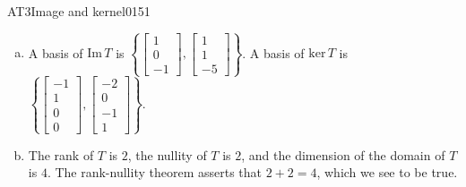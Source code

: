 \begin{exercise}{AT3}{Image and kernel}{0151}
\begin{exerciseAnswer}
\begin{enumerate}[(a)]
 
\item  

 A basis of \(\mathrm{Im}\,T\) is \(\left\{ \left[\begin{array}{c}
1 \\
0 \\
-1
\end{array}\right] , \left[\begin{array}{c}
1 \\
1 \\
-5
\end{array}\right] \right\}\). A basis of \(\mathrm{ker}\,T\) is \(\left\{ \left[\begin{array}{c}
-1 \\
1 \\
0 \\
0
\end{array}\right] , \left[\begin{array}{c}
-2 \\
0 \\
-1 \\
1
\end{array}\right] \right\}\). 

 
\item  

 The rank of \(T\) is \(2\), the nullity of \(T\) is \(2\), and the dimension of the domain of \(T\) is \(4\). The rank-nullity theorem asserts that \(2+2=4\), which we see to be true. 

 
\end{enumerate}

     \end{exerciseAnswer}
 \end{exercise}


\newpage




